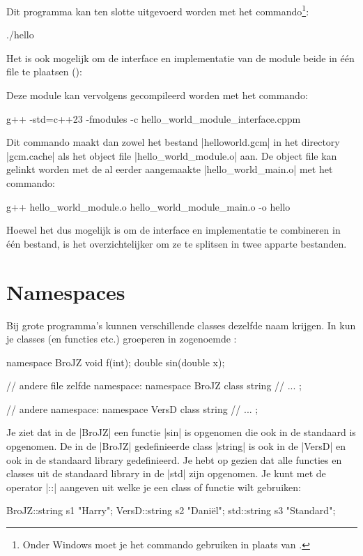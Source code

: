 \begin{cpplstShortInline}
Dit programma kan ten slotte uitgevoerd worden met het commando\footnote{%
	Onder Windows moet je het commando  gebruiken in plaats van .}:
\begin{coutput}
./hello
\end{coutput}

Het is ook mogelijk om de interface en implementatie van de module beide in één file te plaatsen ():

Deze module kan vervolgens gecompileerd worden met het commando:
\begin{coutput}
g++ -std=c++23 -fmodules -c hello_world_module_interface.cppm
\end{coutput}
Dit commando maakt dan zowel het bestand |helloworld.gcm| in het directory |gcm.cache| als het object file |hello_world_module.o| aan.
De object file kan gelinkt worden met de al eerder aangemaakte |hello_world_main.o| met het commando:
\begin{coutput}
g++ hello_world_module.o hello_world_module_main.o -o hello
\end{coutput}

Hoewel het dus mogelijk is om de interface en implementatie te combineren in één bestand, is het overzichtelijker om ze te splitsen in twee apparte bestanden.

\section{Namespaces}
\label{sec:namespaces}
Bij grote programma's kunnen verschillende classes  dezelfde naam krijgen.
In \Cpp{} kun je classes (en functies etc.) groeperen in zogenoemde \emph{}:
\begin{cpplstfragment}
namespace BroJZ {
   void f(int);
   double sin(double x);
}

// andere file zelfde namespace:
namespace BroJZ {
   class string {
   //  ...
   };
}

// andere namespace:
namespace VersD {
   class string {
   //  ...
   };
}
\end{cpplstfragment}

Je ziet dat in de  |BroJZ| een functie |sin| is opgenomen die ook in de standaard  is opgenomen.
De in de  |BroJZ| gedefinieerde class |string| is ook in de  |VersD| en ook in de standaard library gedefinieerd.
Je hebt op  gezien dat alle functies en classes uit de standaard library in de  |std| zijn opgenomen.
Je kunt met de \emph{} operator |::| aangeven uit welke  je een class of functie wilt gebruiken:
\begin{cpplstfragment}
	BroJZ::string s1 {"Harry"};
	VersD::string s2 {"Daniël"};
	std::string s3 {"Standard"};
\end{cpplstfragment}


\end{cpplstShortInline}
